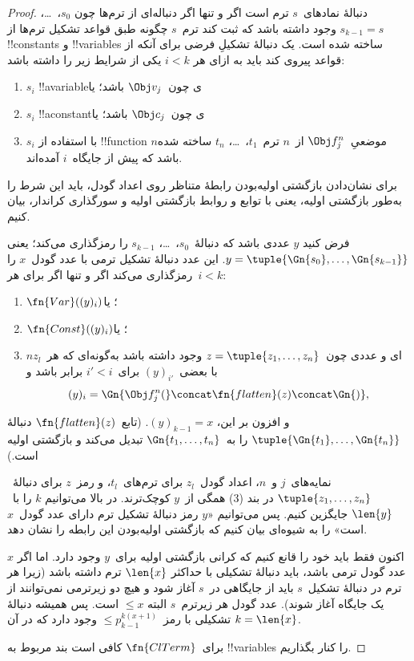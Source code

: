 \documentclass[../../../include/open-logic-section]{subfiles}
\begin{document}
\begin{proof}
دنبالهٔ نمادهای~$s$ ترم است اگر و تنها اگر دنباله‌ای از ترم‌ها چون
$s_0$،~\dots، $s_{k-1}=s$ وجود داشته باشد که ثبت کند ترم~$s$ چگونه
طبق قواعد تشکیل ترم‌ها از !!{constant}s و !!{variable}s ساخته شده است. یک
دنبالهٔ تشکیلِ فرضی برای آنکه از قواعد پیروی کند باید به ازای هر
$i<k$ یکی از شرایط زیر را داشته باشد:
\begin{enumerate}
\item $s_i$ !!a{variable}ی چون~$\Obj v_j$ باشد؛ یا
\item $s_i$ !!a{constant}ی چون~$\Obj c_j$ باشد؛ یا
\item $s_i$ با استفاده از !!{function} $n$موضعیِ~$\Obj f_j^n$ از~$n$
  ترم~$t_1$،~\dots، $t_n$ ساخته شده باشد که پیش از جایگاه~$i$ آمده‌اند.
\end{enumerate}
برای نشان‌دادن بازگشتی اولیه‌بودن رابطهٔ متناظر روی اعداد گودل، باید
این شرط را به‌طور بازگشتی اولیه، یعنی با توابع و روابط بازگشتی اولیه
و سورگذاری کراندار، بیان کنیم.

فرض کنید $y$ عددی باشد که دنبالهٔ~$s_0$،~\dots، $s_{k-1}$ را رمزگذاری
می‌کند؛ یعنی
$y=\tuple{\Gn{s_0},\dots,\Gn{s_{k-1}}}$. این عدد دنبالهٔ تشکیل ترمی
با عدد گودل~$x$ را رمزگذاری می‌کند اگر و تنها اگر برای هر~$i<k$:
\begin{enumerate}
\item $\fn{Var}((y)_i)$؛ یا
\item $\fn{Const}((y)_i)$؛ یا
\item $n$ای و عددی چون~$z=\tuple{z_1,\dots,z_n}$ وجود داشته باشد
  به‌گونه‌ای که هر~$z_l$ با بعضی~$(y)_{i'}$ برای~$i'<i$ برابر باشد و
\[
(y)_i = \Gn{\Obj f^n_j(} \concat \fn{flatten}(z) \concat \Gn{)},
\]
\end{enumerate}
و افزون بر این، $(y)_{k-1}=x$. (تابع~$\fn{flatten}(z)$ دنبالهٔ
$\tuple{\Gn{t_1},\dots,\Gn{t_n}}$ را به~$\Gn{t_1,\dots,t_n}$ تبدیل
می‌کند و بازگشتی اولیه است.)

نمایه‌های~$j$ و~$n$، اعداد گودل~$z_l$ برای ترم‌های~$t_l$، و رمز~$z$
برای دنبالهٔ~$\tuple{z_1,\dots,z_n}$ در بند (3) همگی از~$y$
کوچک‌ترند. در بالا می‌توانیم $k$ را با~$\len{y}$ جایگزین کنیم. پس
می‌توانیم «$y$ رمز دنبالهٔ تشکیل ترم دارای عدد گودل~$x$ است» را به
شیوه‌ای بیان کنیم که بازگشتی اولیه‌بودن این رابطه را نشان دهد.

اکنون فقط باید خود را قانع کنیم که کرانی بازگشتی اولیه برای~$y$ وجود
دارد. اما اگر $x$ عدد گودل ترمی باشد، باید دنبالهٔ تشکیلی با حداکثر
$\len{x}$ ترم داشته باشد (زیرا هر ترم در دنبالهٔ تشکیل~$s$ باید از
جایگاهی در~$s$ آغاز شود و هیچ دو زیرترمی نمی‌توانند از یک جایگاه آغاز
شوند). عدد گودل هر زیرترم~$s$ البته $\le x$ است. پس همیشه دنبالهٔ
تشکیلی با رمز~$\le p_{k-1}^{k(x+1)}$ وجود دارد که در آن
$k=\len{x}$.

برای~$\fn{ClTerm}$ کافی است بند مربوط به !!{variable}s را کنار بگذاریم.
\end{proof}
\end{document}

